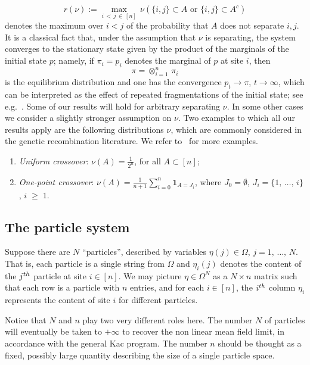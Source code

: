 \documentclass[10pt,a4paper]{amsart}
\renewcommand{\geq}{\;\geqslant\;}
\newcommand{\ind}{\mathbf{1}}
\let\O=\Omega
\theoremstyle{definition}
\theoremstyle{plain}
\numberwithin{equation}{section}
\begin{document}
\begin{equation}\label{def:rnu}
r(\nu):= \max_{i\,<\,j\,\in\,[n]}\,\nu\left(\{i,j\}\subset A \text{ or }\{i,j\}\subset A^c\right)
\end{equation}
denotes the maximum over $i<j$ of the probability that $A$ does not separate $i,j$. It is a classical fact that, under the assumption that $\nu$ is separating, the system converges to the stationary state given by the product of the marginals of the initial state $p$; namely, if $\pi_i=p_{i}$ denotes the marginal of $p$ at site $i$, then
\begin{equation}\label{station}
\pi=\otimes_{i=1}^n\,\pi_i
\end{equation}
is the equilibrium distribution and one has the convergence $p_t\to \pi$, $t\to\infty$, which can be interpreted as the effect of repeated fragmentations of the initial state; see e.g.~\cite{Sinetal2}. Some of our results will hold for arbitrary separating $\nu$. In some other cases we consider a slightly stronger assumption on $\nu$. Two examples to which all our results apply are the following distributions $\nu$, which are commonly considered in the genetic recombination literature. We refer to~\cite{entprod,Sinetal2} for more examples.
\begin{enumerate}
\item \emph{Uniform crossover}: $\nu(A)=\frac1{2^n}$, for all $A\subset[n]$;
\item \emph{One-point crossover}: $\nu(A)=\tfrac1{n+1}\sum_{i=0}^n\ind_{A=J_i} $, where $J_0=\emptyset$, $J_i=\{1,\,\dots,\,i\}$, $i\geq 1$.
\end{enumerate}

\setcounter{subsection}{1}
\setcounter{equation}{3}
\subsection{The particle system}

Suppose there are $N$ ``particles'', described by variables $\eta(j)\in\O$, $j=1,\,\dots,\,N$. That is, each particle is a single string from $\O$ and $\eta_i(j)$ denotes the content of the $j^{\rm th}$ particle at site $i\in[n]$. We may picture $\eta\in\O^N$ as a $N\times n$ matrix such that each row is a particle with $n$ entries, and for each $i\in[n]$, the $i^{\rm th}$ column $\eta_i$ represents the content of site $i$ for different particles.

Notice that $N$ and $n$ play two very different roles here. The number $N$ of particles will eventually be taken to $+\infty$ to recover the non linear mean field limit, in accordance with the general Kac program. The number $n$ should be thought as a fixed, possibly large quantity describing the size of a single particle space.
\end{document}
